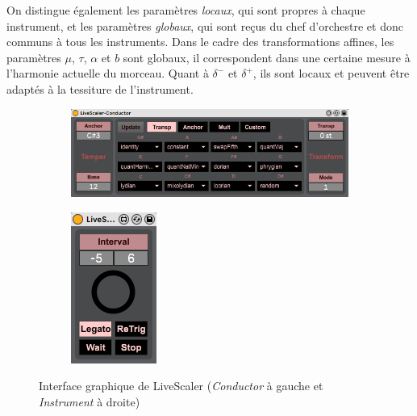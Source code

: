 On distingue également les paramètres \emph{locaux}, qui sont propres à chaque instrument, et les paramètres \emph{globaux}, qui sont reçus du chef d'orchestre et donc communs à tous les instruments. Dans le cadre des transformations affines, les paramètres $\mu$, $\tau$, $\alpha$  et $b$ sont globaux, il correspondent dans une certaine mesure à l'harmonie actuelle du morceau. Quant à $\delta^-$ et $\delta^+$, ils sont locaux et peuvent être adaptés à la tessiture de l'instrument.
\begin{figure}[h]
  \centering
  \begin{subfigure}{0.83\textwidth}
    \includegraphics{Figures/LS-Conductor-UI.png}
  \end{subfigure}
  \begin{subfigure}{0.15\textwidth}
    \includegraphics{Figures/LS-Instrument-UI.png}
  \end{subfigure}
  
  \caption{Interface graphique de LiveScaler (\emph{Conductor} à gauche  et  \emph{Instrument} à droite) }
  \label{fig:LiveScalerUI}
\end{figure}